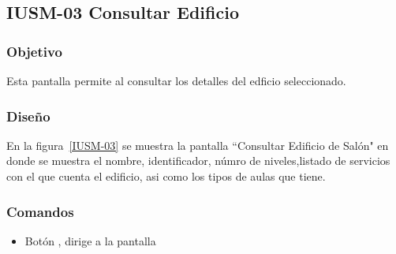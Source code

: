 \subsection{IUSM-03 Consultar Edificio}

\subsubsection{Objetivo}


Esta pantalla permite al  consultar los detalles del edficio seleccionado.
\subsubsection{Diseño}


En la figura~\ref{IUSM-03} se muestra la pantalla ``Consultar Edificio de Salón" en donde se muestra el nombre, identificador, númro de niveles,listado de servicios con el que cuenta el edificio, asi como los tipos de aulas que tiene.
\subsubsection{Comandos}
    \begin{itemize}

	\item Botón \botCerrar, dirige a la pantalla 

    \end{itemize}
